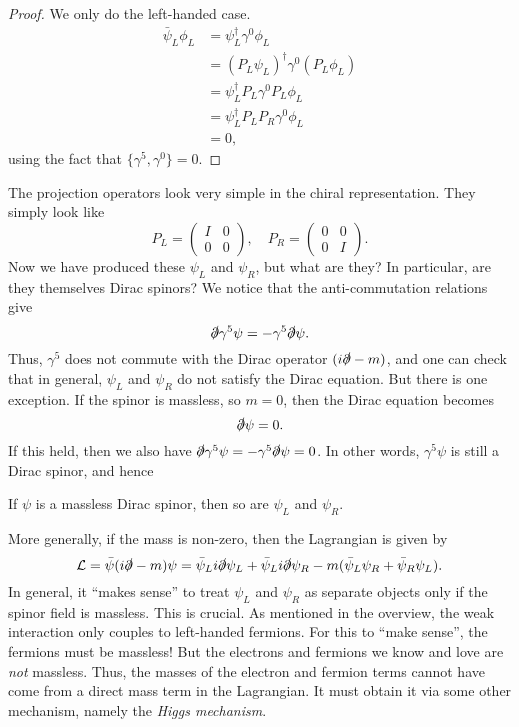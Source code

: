 \documentclass[a4paper]{article}
\begin{document}
\begin{proof}
  We only do the left-handed case.
  \begin{align*}
    \bar\psi_L \phi_L &= \psi_L^\dagger \gamma^0 \phi_L\\
    &= (P_L \psi_L)^\dagger \gamma^0 (P_L \phi_L)\\
    &= \psi_L^\dagger P_L \gamma^0 P_L \phi_L\\
    &= \psi_L^\dagger P_L P_R \gamma^0 \phi_L\\
    &= 0,
  \end{align*}
  using the fact that $\{\gamma^5, \gamma^0\} = 0$.
\end{proof}
The projection operators look very simple in the chiral representation. They simply look like
\[
  P_L =
  \begin{pmatrix}
    I & 0\\
    0 & 0
  \end{pmatrix},\quad
  P_R =
  \begin{pmatrix}
    0 & 0\\
    0 & I
  \end{pmatrix}.
\]
Now we have produced these $\psi_L$ and $\psi_R$, but what are they? In particular, are they themselves Dirac spinors? We notice that the anti-commutation relations give
\[
  \slashed \partial \gamma^5 \psi = -\gamma^5 \slashed \partial \psi.
\]
Thus, $\gamma^5$ does not commute with the Dirac operator $(i\slashed \partial - m)$, and one can check that in general, $\psi_L$ and $\psi_R$ do not satisfy the Dirac equation. But there is one exception. If the spinor is massless, so $m = 0$, then the Dirac equation becomes
\[
  \slashed \partial \psi = 0.
\]
If this held, then we also have $\slashed \partial \gamma^5 \psi = - \gamma^5 \slashed \partial \psi = 0$. In other words, $\gamma^5 \psi$ is still a Dirac spinor, and hence
\begin{prop}
  If $\psi$ is a massless Dirac spinor, then so are $\psi_L$ and $\psi_R$.
\end{prop}
More generally, if the mass is non-zero, then the Lagrangian is given by
\[
  \mathcal{L} = \bar\psi (i \slashed{\partial} - m) \psi = \bar\psi_L i \slashed{\partial} \psi_L + \bar\psi_L i \slashed{\partial} \psi_R - m (\bar\psi_L \psi_R + \bar\psi_R \psi_L).
\]
In general, it ``makes sense'' to treat $\psi_L$ and $\psi_R$ as separate objects only if the spinor field is massless. This is crucial. As mentioned in the overview, the weak interaction only couples to left-handed fermions. For this to ``make sense'', the fermions must be massless! But the electrons and fermions we know and love are \emph{not} massless. Thus, the masses of the electron and fermion terms cannot have come from a direct mass term in the Lagrangian. It must obtain it via some other mechanism, namely the \emph{Higgs mechanism}.
\end{document}
